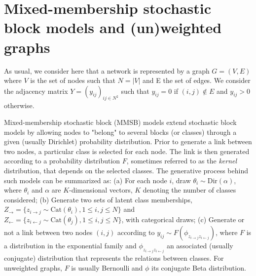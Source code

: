 \section{Mixed-membership stochastic block models and (un)weighted graphs}
\label{sec:model}

As usual, we consider here that a network is represented by a graph $G=(V,E)$ where $V$ is the set of nodes such that $N=|V|$ and E the set of edges. We consider the adjacency matrix $Y=(y_{ij})_{ij\in N^2}$ such that $y_{ij}=0$ if $(i,j) \notin E$ and $y_{ij} > 0$ otherwise.

Mixed-membership stochastic block (MMSB) models extend stochastic block models \cite{airoldi2009mixed} by allowing nodes to "belong" to several blocks (or classes) through a given (usually Dirichlet) probability distribution. Prior to generate a link between two nodes, a particular class is selected for each node. The link is then generated according to a probability distribution $F$, sometimes referred to as the \textit{kernel} distribution, that depends on the selected classes. The generative process behind such models can be summarized as: (a) For each node $i$, draw $\theta_i \sim \textrm{Dir}(\alpha)$, where $\theta_i$ and $\alpha$ are $K$-dimensional vectors, $K$ denoting  the number of classes considered; (b) Generate two sets of latent class memberships, $Z_\rightarrow = \{z_{i\rightarrow j} \sim \textrm{Cat}(\theta_i),  1 \le i,j \le N\}$ and $Z_\leftarrow = \{z_{i\leftarrow j} \sim \textrm{Cat}(\theta_j),  1 \le i,j \le N\}$, with categorical draws; (c) Generate or not a link between two nodes $(i,j)$ according to $y_{ij} \sim F(\phi_{z_{i \rightarrow j}z_{i \leftarrow j}})$, where $F$ is a distribution in the exponential family and $\phi_{z_{i \rightarrow j}z_{i \leftarrow j}}$ an associated (usually conjugate) distribution that represents the relations between classes. For unweighted graphs, $F$ is usually Bernoulli and $\phi$ its conjugate Beta distribution.


